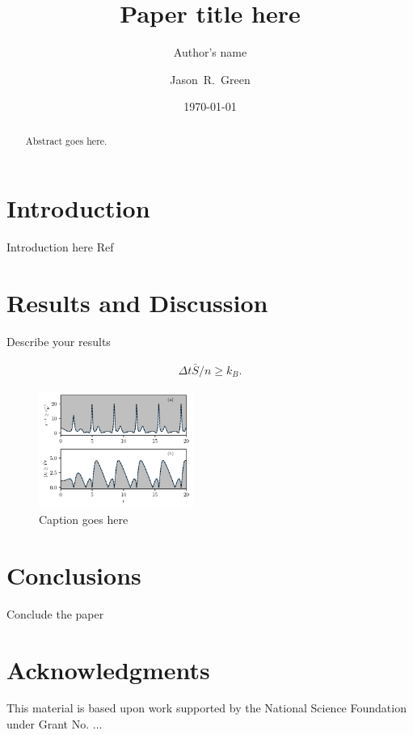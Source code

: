 \documentclass[prl,aps,reprint,noshowpacs,superscriptaddress,floatfix,letterpaper,longbibliography]{revtex4-2}
\begin{document}
	
	\title{Paper title here} 
	
	\author{Author's name}
	\author{Jason~R.~Green}
	\date{\today}
	
	\begin{abstract}	
		Abstract goes here.
		\lipsum[1-1]
	\end{abstract}
\maketitle

\section{Introduction}
Introduction here Ref~\cite{Nicholson2020}

\lipsum[2-3]
\section{Results and Discussion}
Describe your results

\begin{align}
\Delta t \bar S/n\geq k_B.
\end{align}

\lipsum[2-3]
\begin{figure}[h!]
	\centering
	\hspace*{-0.75cm}\includegraphics[width=0.45\textwidth]{sample-plot.pdf}
	\caption{Caption goes here}
	\label{fig:plot-label}
\end{figure}


\section{Conclusions}

Conclude the paper

\lipsum[2-3]

\section{Acknowledgments}
\begin{acknowledgments}
	This material is based upon work supported by the National Science Foundation under Grant No. ...
	
\end{acknowledgments}
\appendix



\end{document}
